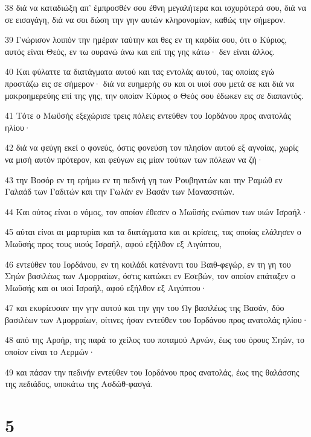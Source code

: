 \par 38 διά να καταδιώξη απ' έμπροσθέν σου έθνη μεγαλήτερα και ισχυρότερά σου, διά να σε εισαγάγη, διά να σοι δώση την γην αυτών κληρονομίαν, καθώς την σήμερον.
\par 39 Γνώρισον λοιπόν την ημέραν ταύτην και θες εν τη καρδία σου, ότι ο Κύριος, αυτός είναι Θεός, εν τω ουρανώ άνω και επί της γης κάτω· δεν είναι άλλος.
\par 40 Και φύλαττε τα διατάγματα αυτού και τας εντολάς αυτού, τας οποίας εγώ προστάζω εις σε σήμερον· διά να ευημερής συ και οι υιοί σου μετά σε και διά να μακροημερεύης επί της γης, την οποίαν Κύριος ο Θεός σου έδωκεν εις σε διαπαντός.
\par 41 Τότε ο Μωϋσής εξεχώρισε τρεις πόλεις εντεύθεν του Ιορδάνου προς ανατολάς ηλίου·
\par 42 διά να φεύγη εκεί ο φονεύς, όστις φονεύση τον πλησίον αυτού εξ αγνοίας, χωρίς να μισή αυτόν πρότερον, και φεύγων εις μίαν τούτων των πόλεων να ζή·
\par 43 την Βοσόρ εν τη ερήμω εν τη πεδινή γη των Ρουβηνιτών και την Ραμώθ εν Γαλαάδ των Γαδιτών και την Γωλάν εν Βασάν των Μανασσιτών.
\par 44 Και ούτος είναι ο νόμος, τον οποίον έθεσεν ο Μωϋσής ενώπιον των υιών Ισραήλ·
\par 45 αύται είναι αι μαρτυρίαι και τα διατάγματα και αι κρίσεις, τας οποίας ελάλησεν ο Μωϋσής προς τους υιούς Ισραήλ, αφού εξήλθον εξ Αιγύπτου,
\par 46 εντεύθεν του Ιορδάνου, εν τη κοιλάδι κατέναντι του Βαιθ-φεγώρ, εν τη γη του Σηών βασιλέως των Αμορραίων, όστις κατώκει εν Εσεβών, τον οποίον επάταξεν ο Μωϋσής και οι υιοί Ισραήλ, αφού εξήλθον εξ Αιγύπτου·
\par 47 και εκυρίευσαν την γην αυτού και την γην του Ωγ βασιλέως της Βασάν, δύο βασιλέων των Αμορραίων, οίτινες ήσαν εντεύθεν του Ιορδάνου προς ανατολάς ηλίου·
\par 48 από της Αροήρ, της παρά το χείλος του ποταμού Αρνών, έως του όρους Σηών, το οποίον είναι το Αερμών·
\par 49 και πάσαν την πεδινήν εντεύθεν του Ιορδάνου προς ανατολάς, έως της θαλάσσης της πεδιάδος, υποκάτω της Ασδώθ-φασγά.

\chapter{5}

